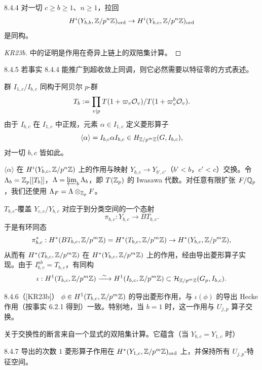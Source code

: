 \begin{fact}{8.4.4}\label{thm:a6-06-4}
对一切 $c\ge b\ge1$、$n\ge1$，拉回
\[
H^i(Y_{b,b},\mathbb{Z}/p^n\mathbb{Z})_{\mathrm{ord}}\to H^i(Y_{b,c},\mathbb{Z}/p^n\mathbb{Z})_{\mathrm{ord}}
\]
是同构。
\end{fact}

\begin{proof}
[KR23b] 中的证明是作用在奇异上链上的双陪集计算。
\end{proof}

\begin{rem}{8.4.5}\label{thm:a6-06-5}
若事实 8.4.4 能推广到超收敛上同调，则它必然需要以特征零的方式表述。
\end{rem}

群 $I_{1,c}/I_{b,c}$ 同构于阿贝尔 $p$-群
\[
T_b:=\prod_{v\mid p}T(1+\varpi_v\mathcal{O}_v)/T(1+\varpi_v^b\mathcal{O}_v).
\]
由于 $I_{b,c}$ 在 $I_{1,c}$ 中正规，元素 $\alpha\in I_{1,c}$ 定义菱形算子
\[
\langle\alpha\rangle=I_{b,c}\alpha I_{b,c}\in H_{\mathbb{Z}/p^m\mathbb{Z}}(G,I_{b,c}),
\]
对一切 $b,c$ 皆如此。

$\langle\alpha\rangle$ 在 $H^i(Y_{b,c},\mathbb{Z}/p^n\mathbb{Z})$ 上的作用与映射 $Y_{b,c}\to Y_{b',c'}$（$b'<b$，$c'<c$）交换。令 $\Lambda_b=\mathbb{Z}_p[[T_b]]$，$\Lambda=\varprojlim_b\Lambda_b$，即 $T(\mathbb{Z}_p)$ 的 Iwasawa 代数。对任意有限扩张 $F/\mathbb{Q}_p$，我们还使用 $\Lambda_F=\Lambda\otimes_{\mathbb{Z}_p}F$。

$T_{b,c}$-覆盖 $Y_{c,c}/Y_{b,c}$ 对应于到分类空间的一个态射
\[
\pi_{b,c}:Y_{b,c}\to BT_{b,c}.
\]
于是有环同态
\[
\pi_{b,c}^*:H^*(BT_{b,c},\mathbb{Z}/p^m\mathbb{Z})=H^*(T_{b,c},\mathbb{Z}/p^m\mathbb{Z})\to H^*(Y_{b,c},\mathbb{Z}/p^m\mathbb{Z}),
\]
从而有 $H^*(T_{b,c},\mathbb{Z}/p^m\mathbb{Z})$ 在 $H^*(Y_{b,c},\mathbb{Z}/p^m\mathbb{Z})$ 上的作用，经由导出菱形算子实现。由于 $I_{b,c}^{ab}=T_{b,c}$，有同构
\[
\iota:H^1(T_{b,c},\mathbb{Z}/p^m\mathbb{Z})\xrightarrow{\ \sim\ } H^1(I_{b,c},\mathbb{Z}/p^m\mathbb{Z})\subset\mathcal H_{\mathbb{Z}/p^m\mathbb{Z}}(G_p,I_{b,c}).
\]

\begin{lem}{8.4.6}（[KR23b]）\label{thm:a6-06-6}
$\phi\in H^1(T_{b,c},\mathbb{Z}/p^m\mathbb{Z})$ 的导出菱形作用，与 $\iota(\phi)$ 的导出 Hecke 作用（按事实 6.2.1 得到）一致。特别地，当 $b=1$ 时，这一作用与 $U_{j,p}$ 算子交换。
\end{lem}

关于交换性的断言来自一个显式的双陪集计算。它蕴含（当 $Y_{b,c}=Y_{1,c}$ 时）

\begin{cor}{8.4.7}\label{thm:a6-06-7}
导出的次数 $1$ 菱形算子作用在 $H^*(Y_{1,c},\mathbb{Z}/p^m\mathbb{Z})_{\mathrm{ord}}$ 上，并保持所有 $U_{j,p}$-特征空间。
\end{cor}

